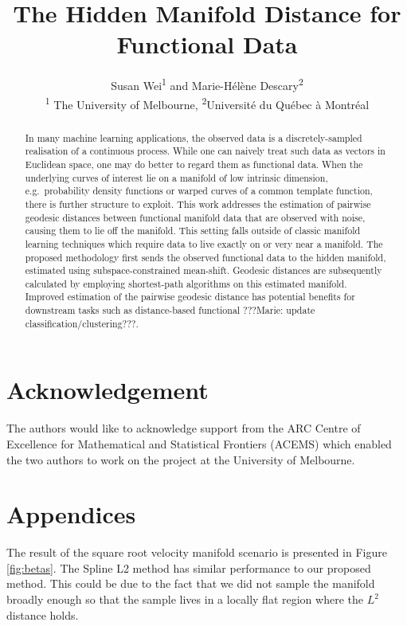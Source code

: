 \documentclass[letterpaper]{article} %
\title{The Hidden Manifold Distance for Functional Data}
\author{Susan Wei\textsuperscript{\rm 1} and Marie-H\'el\`{e}ne Descary\textsuperscript{\rm 2}\\ %
\textsuperscript{\rm 1} The University of Melbourne, \textsuperscript{\rm 2}Universit\'e du Qu\'ebec \`{a} Montr\'eal\\ %
}
\begin{document}
\maketitle

\begin{abstract}
In many machine learning applications, the observed data is a
discretely-sampled realisation of a continuous process. While one can
naively treat such data as vectors in Euclidean space, one may do better
to regard them as functional data.  
When the underlying curves of interest lie on a manifold of low intrinsic
dimension, e.g.~probability density
functions or warped curves of a common template function, there is further structure to exploit. 
This work addresses the estimation of pairwise geodesic
distances between functional manifold data that are observed with noise,
causing them to lie off the manifold. This setting falls outside of
classic manifold learning techniques which require data to live exactly
on or very near a manifold. The proposed methodology first sends the
observed functional data to the hidden manifold, estimated using
subspace-constrained mean-shift. Geodesic distances are subsequently
calculated by employing shortest-path algorithms on this estimated
manifold. Improved estimation of the pairwise geodesic distance has
potential benefits for downstream tasks such as distance-based functional
???Marie: update classification/clustering???.
\end{abstract}





\section{Acknowledgement}\label{acknowledgement}

The authors would like to acknowledge support from the ARC Centre of
Excellence for Mathematical and Statistical Frontiers (ACEMS) which
enabled the two authors to work on the project at the University of
Melbourne.

\section{Appendices}\label{appendices}

The result of the square root velocity manifold scenario is presented in
Figure \ref{fig:betas}. The Spline L2 method has similar performance to
our proposed method. This could be due to the fact that we did not
sample the manifold broadly enough so that the sample lives in a locally
flat region where the \(L^2\) distance holds.
\end{document}
